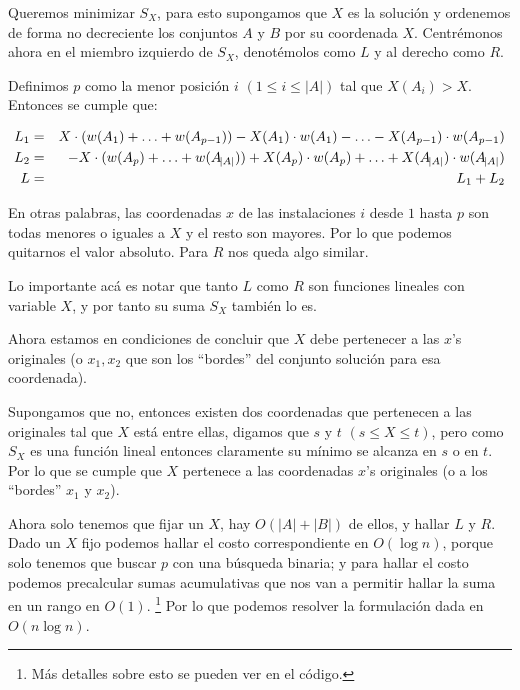 Queremos minimizar $S_X$, para esto supongamos que $X$ es la solución y ordenemos de forma no decreciente los conjuntos $A$ y $B$ por su coordenada $X$. Centrémonos ahora en el miembro izquierdo de $S_X$, denotémolos como $L$ y al derecho como $R$.

Definimos $p$ como la menor posición $i$ $(1 \le i \le |A|)$ tal que $X(A_i) > X$. Entonces se cumple que:

\begin{eqnarray*}
    L_1 &=& X \cdot (w(A_1) + \ldots + w(A_{p-1})) - X(A_1) \cdot w(A_1) - \ldots - X(A_{p-1}) \cdot w(A_{p-1}) \\
    L_2 &=& -X \cdot (w(A_p) + \ldots + w(A_{\abs{A}})) + X(A_p) \cdot w(A_p) + \ldots + X(A_{\abs{A}}) \cdot w(A_{\abs{A}}) \\
    L &=& L_1 + L_2
\end{eqnarray*}

En otras palabras, las coordenadas $x$ de las instalaciones $i$ desde $1$ hasta $p$ son todas menores o iguales a $X$ y el resto son mayores. Por lo que podemos quitarnos el valor absoluto. Para $R$ nos queda algo similar.

Lo importante acá es notar que tanto $L$ como $R$ son funciones lineales con variable $X$, y por tanto su suma $S_X$ también lo es.

Ahora estamos en condiciones de concluir que $X$ debe pertenecer a las $x$'s originales (o $x_1, x_2$ que son los ``bordes'' del conjunto solución para esa coordenada).

Supongamos que no, entonces existen dos coordenadas que pertenecen a las originales tal que $X$ está entre ellas, digamos que $s$ y $t$ $(s \le X \le t)$, pero como $S_X$ es una función lineal entonces claramente su mínimo se alcanza en $s$ o en $t$. Por lo que se cumple que $X$ pertenece a las coordenadas $x$'s originales (o a los ``bordes'' $x_1$ y $x_2$).

Ahora solo tenemos que fijar un $X$, hay $O(|A| + |B|)$ de ellos, y hallar $L$ y $R$. Dado un $X$ fijo podemos hallar el costo correspondiente en $O(\log n)$, porque solo tenemos que buscar $p$ con una búsqueda binaria; y para hallar el costo podemos precalcular sumas acumulativas que nos van a permitir hallar la suma en un rango en $O(1)$. \footnote{Más detalles sobre esto se pueden ver en el código.} Por lo que podemos resolver la formulación dada en $O(n \log n)$.